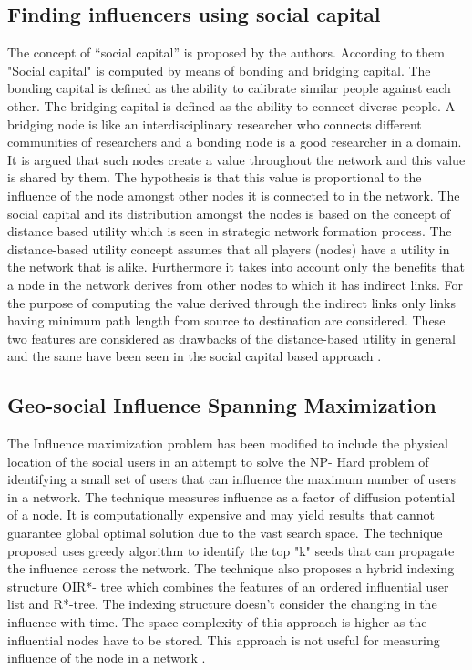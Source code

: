 \subsection{Finding influencers using social capital}
The concept of “social capital” is proposed by the authors. According to them "Social capital" is computed by means of bonding and bridging capital. The bonding capital is defined as the ability to calibrate similar people against each other. The bridging capital is defined as the ability to connect diverse people. A bridging node is like an interdisciplinary researcher who connects different communities of researchers and a bonding node is a good researcher in a domain. It is argued that such nodes create a value throughout the network and this value is shared by them. The hypothesis is that this value is proportional to the influence of the node amongst other nodes it is connected to in the network. The social capital and its distribution amongst the nodes is based on the concept of distance based utility which is seen in strategic network formation process. The distance-based utility concept assumes that all players (nodes) have a utility in the network that is alike. Furthermore it takes into account only the benefits that a node in the network derives from other nodes to which it has indirect links. For the purpose of computing the value derived through the indirect links only links having minimum path length from source to destination are considered. These two features are considered as drawbacks of the distance-based utility in general and the same have been seen in the social capital based approach \cite{aps:13}.

\subsection{Geo-social Influence Spanning Maximization}
The Influence maximization problem has been modified to include the physical location of the social users in an attempt to solve the NP- Hard problem of identifying a small set of users that can influence the maximum number of users in a network. The technique measures influence as a factor of diffusion potential of a node. It is computationally expensive and may yield results that cannot guarantee global optimal solution due to the vast search space. The technique proposed uses greedy algorithm to identify the top "k" seeds that can propagate the influence across the network. The technique also proposes a hybrid indexing structure OIR*- tree which combines the features of an ordered influential user list and R*-tree. The indexing structure doesn’t consider the changing in the influence with time. The space complexity of this approach is higher as the influential nodes have to be stored. This approach is not useful for measuring influence of the node in a network \cite{aps:21}.

